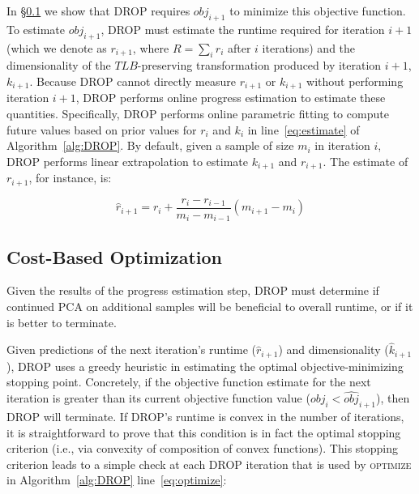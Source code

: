 In \S\ref{subsec:opt} we show that DROP requires $obj_{i+1}$ to minimize this objective function.
To estimate $obj_{i+1}$, DROP must estimate the runtime required for iteration $i+1$ (which we denote as $r_{i+1}$, where $R=\sum_i r_i$ after $i$ iterations) and the dimensionality of the $TLB$-preserving transformation produced by iteration $i+1$, $k_{i+1}$. 
Because DROP cannot directly measure $r_{i+1}$ or $k_{i+1}$ without performing iteration $i+1$, DROP performs online progress estimation to estimate these quantities. Specifically, DROP performs online parametric fitting to compute future values based on prior values for $r_{i}$ and $k_i$ in line~\ref{eq:estimate} of Algorithm~\ref{alg:DROP}. 
By default, given a sample of size $m_i$ in iteration $i$, DROP performs linear extrapolation to estimate $k_{i+1}$ and $r_{i+1}$. The estimate of $r_{i+1}$, for instance, is:

\vspace{-.4cm}
\begin{equation*}
\hat{r}_{i+1} = r_i + \frac{r_i - r_{i-1}}{m_i - m_{i-1}} (m_{i+1} -  m_i)
\end{equation*}

\subsection{Cost-Based Optimization}
\label{subsec:opt}

Given the results of the progress estimation step, DROP must determine if continued PCA on additional samples will be beneficial to overall runtime, or if it is better to terminate. 

Given predictions of the next iteration's runtime ($\hat{r}_{i+1}$) and dimensionality ($\hat{k}_{i+1}$), DROP uses a greedy heuristic in estimating the optimal objective-minimizing stopping point.
Concretely, if the objective function estimate for the next iteration is greater than its current objective function value ($obj_i < \widehat{obj}_{i+1}$), then DROP will terminate. 
If DROP's runtime is convex in the number of iterations, it is straightforward to prove that this condition is in fact the optimal stopping criterion (i.e., via convexity of composition of convex functions). 
This stopping criterion leads to a simple check at each DROP iteration that is used by  \textsc{optimize} in Algorithm~\ref{alg:DROP} line~\ref{eq:optimize}: 

